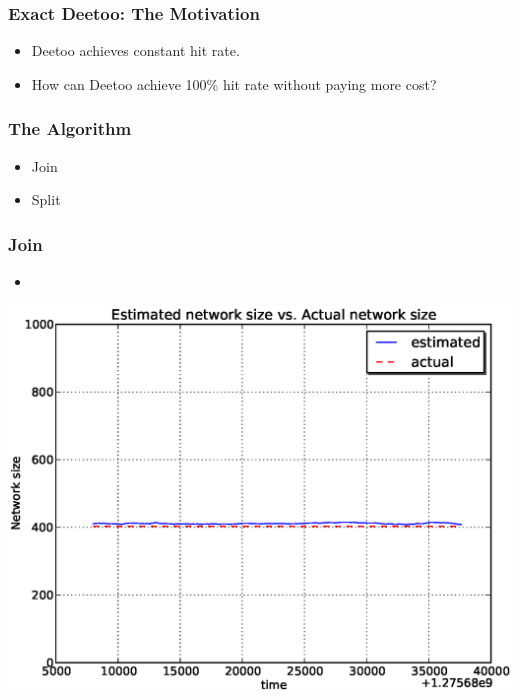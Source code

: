 \documentclass[red]{beamer}
\begin{document}
\begin{frame}
\frametitle{Exact Deetoo: The Motivation}
\begin{itemize}
\item Deetoo achieves constant hit rate.
\item How can Deetoo achieve 100\% hit rate without paying more cost?
\end{itemize}
\end{frame}

\begin{frame}
\frametitle{The Algorithm}
\begin{itemize}
\item Join
\item Split
\end{itemize}
\end{frame}

\begin{frame}
\frametitle{Join}
\begin{itemize}
\item 
\end{itemize}
\begin{center}
\includegraphics[scale=0.4]{figs/plab_size.eps}
\end{center}
\end{frame}
\end{document}
